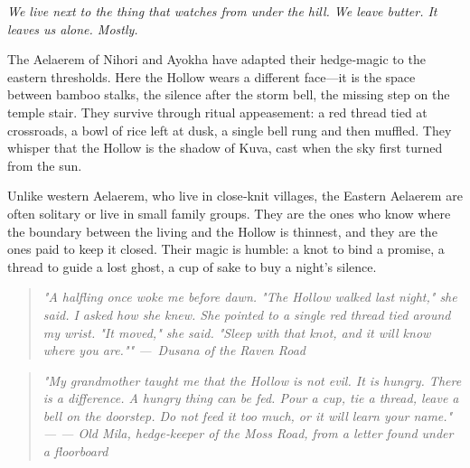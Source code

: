 \documentclass[12pt]{book}
\newcommand{\dusana}[1]{%
    \begin{quote}\itshape #1 ---~Dusana of the Raven Road\end{quote}}
\newcommand{\letter}[2]{%
    \begin{quote}\small\itshape #1 \hfill --- #2\end{quote}}
\begin{document}
\noindent \textit{We live next to the thing that watches from under the hill. We leave butter. It leaves us alone. Mostly.}

The Aelaerem of Nihori and Ayokha have adapted their hedge‑magic to the eastern thresholds. Here the Hollow wears a different face---it is the space between bamboo stalks, the silence after the storm bell, the missing step on the temple stair. They survive through ritual appeasement: a red thread tied at crossroads, a bowl of rice left at dusk, a single bell rung and then muffled. They whisper that the Hollow is the shadow of Kuva, cast when the sky first turned from the sun.

Unlike western Aelaerem, who live in close‑knit villages, the Eastern Aelaerem are often solitary or live in small family groups. They are the ones who know where the boundary between the living and the Hollow is thinnest, and they are the ones paid to keep it closed. Their magic is humble: a knot to bind a promise, a thread to guide a lost ghost, a cup of sake to buy a night's silence.

\vspace{0.5em}
\dusana{"A halfling once woke me before dawn. "The Hollow walked last night," she said. I asked how she knew. She pointed to a single red thread tied around my wrist. "It moved," she said. "Sleep with that knot, and it will know where you are.""}

\letter{"My grandmother taught me that the Hollow is not evil. It is hungry. There is a difference. A hungry thing can be fed. Pour a cup, tie a thread, leave a bell on the doorstep. Do not feed it too much, or it will learn your name."}{--- Old Mila, hedge‑keeper of the Moss Road, from a letter found under a floorboard}
\end{document}
